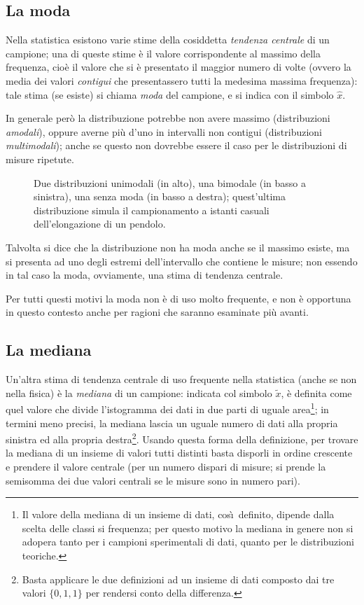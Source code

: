 \subsection{La moda}%
Nella statistica esistono varie stime della cosiddetta
\emph{tendenza centrale} di un campione; una di queste stime
\`e il valore corrispondente al massimo della frequenza,
cio\`e il valore che si \`e presentato il maggior numero di
volte (ovvero la media dei valori \emph{contigui} che
presentassero tutti la medesima massima frequenza): tale
stima (se esiste) si chiama \emph{moda} del campione, e si
indica con il simbolo $\widehat x$.

In generale per\`o la distribuzione potrebbe non avere
massimo (distribuzioni \emph{amodali}), oppure averne pi\`u
d'uno in intervalli non contigui (distribuzioni
\emph{multimodali}); anche se questo non dovrebbe essere il
caso per le distribuzioni di misure ripetute.
\begin{figure}[htbp]
  \vspace*{2ex}
  \begin{center} {
    
  } \end{center}
  \caption[Distribuzioni unimodali, bimodali e amodali]
  {Due distribuzioni unimodali (in alto), una bimodale (in
    basso a sinistra), una senza moda (in basso a destra);
    quest'ultima distribuzione simula il campionamento a
    istanti casuali dell'elongazione di un pendolo.}
\end{figure}
Talvolta si dice che la distribuzione non ha moda anche se
il massimo esiste, ma si presenta ad uno degli estremi
dell'intervallo che contiene le misure; non essendo in tal
caso la moda, ovviamente, una stima di tendenza centrale.

Per tutti questi motivi la moda non \`e di uso molto
frequente, e non \`e opportuna in questo contesto anche
per ragioni che saranno esaminate pi\`u avanti.%

\subsection{La mediana}%
Un'altra stima di tendenza centrale di uso frequente nella
statistica (anche se non nella fisica) \`e la \emph{mediana}
di un campione: indicata col simbolo $\widetilde x$, \`e
definita come quel valore che divide l'istogramma dei dati
in due parti di uguale area\/\footnote{Il valore della
  mediana di un insieme di dati, cos\`\i\ definito, dipende
  dalla scelta delle classi si frequenza; per questo motivo
  la mediana in genere non si adopera tanto per i campioni
  sperimentali di dati, quanto per le distribuzioni
  teoriche.}; in termini meno precisi, la mediana lascia un
uguale numero di dati alla propria sinistra ed alla propria
destra\/\footnote{Basta applicare le due definizioni ad un
  insieme di dati composto dai tre valori $\{ 0, 1, 1 \}$
  per rendersi conto della differenza.}.  Usando questa
forma della definizione, per trovare la mediana di un
insieme di valori tutti distinti basta disporli in ordine
crescente e prendere il valore centrale (per un numero
dispari di misure; si prende la semisomma dei due valori
centrali se le misure sono in numero pari).

